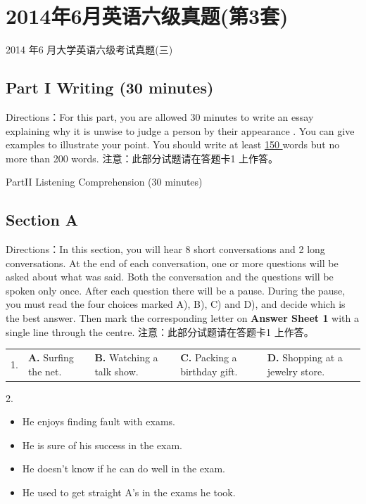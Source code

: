 \documentclass[UTF8,11pt]{ctexart}
\begin{document}
\section*{2014年6月英语六级真题(第3套)}
2014 年6 月大学英语六级考试真题(三)


\subsection*{Part I Writing (30 minutes)}


Directions：For this part, you are allowed 30 minutes to write an essay explaining why it is unwise to judge a person by their appearance . You can give examples to illustrate your point. You should write at least \uline{150 }words but no more than 200 words. 注意：此部分试题请在答题卡1 上作答。


PartII Listening Comprehension (30 minutes)


\subsection*{Section A}


Directions：In this section, you will hear 8 short conversations and 2 long conversations. At the end of each conversation, one or more questions will be asked about what was said. Both the conversation and the questions will be spoken only once. After each question there will be a pause. During the pause, you must read the four choices marked A), B), C) and D), and decide which is the best answer. Then mark the corresponding letter on\textbf{ Answer Sheet 1} with a single line through the centre. 注意：此部分试题请在答题卡1 上作答。


\noindent\begin{tabularx}{\linewidth}{@{}lXXXX@{}}1. & \textbf{A.} Surfing the net. & \textbf{B.} Watching a talk show. & \textbf{C.} Packing a birthday gift. & \textbf{D.} Shopping at a jewelry store.\\\end{tabularx}\par

2.


\begin{itemize}[leftmargin=2em,itemsep=.2em,topsep=.4em]\item[A.] He enjoys finding fault with exams.
\item[B.] He is sure of his success in the exam.
\item[C.] He doesn’t know if he can do well in the exam.
\item[D.] He used to get straight A’s in the exams he took.
\end{itemize}
\end{document}
